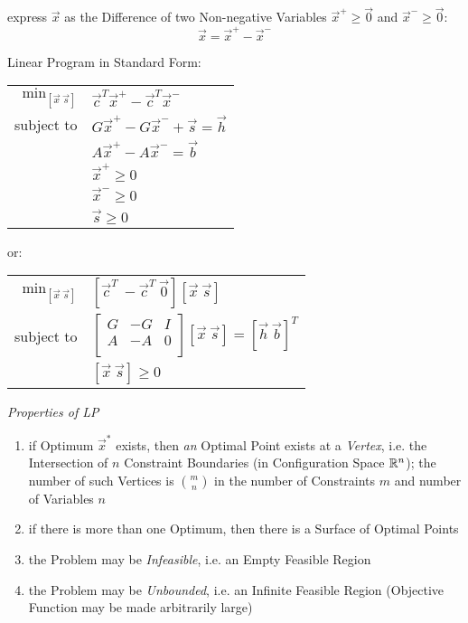 express $\vec{x}$ as the Difference of two Non-negative Variables $\vec{x}^+
\geq \vec{0}$ and $\vec{x}^- \geq \vec{0}$:
\[
  \vec{x} = \vec{x}^+ - \vec{x}^-
\]

Linear Program in Standard Form:

\begin{tabular}{r l}
  $\mathrm{min}_{[\vec{x} \ \vec{s}]}$ &
    $\vec{c}^T\vec{x}^+ - \vec{c}^T\vec{x}^-$     \\
  subject to               & $G\vec{x}^+ - G\vec{x}^- + \vec{s} = \vec{h}$   \\
                           & $A\vec{x}^+ - A\vec{x}^- = \vec{b}$ \\
                           & $\vec{x}^+ \geq 0$ \\
                           & $\vec{x}^- \geq 0$ \\
                           & $\vec{s}   \geq 0$ \\
\end{tabular}

or:

\begin{tabular}{r l}
  $\mathrm{min}_{[\vec{x} \ \vec{s}]}$ &
    $[\vec{c}^T \ -\vec{c}^T \ \vec{0}] [\vec{x} \ \vec{s}]$ \\
  subject to               &
    $\begin{bmatrix} G & -G & I \\ A & -A & 0 \\ \end{bmatrix}
      [\vec{x} \ \vec{s}] = [\vec{h} \ \vec{b}]^T$   \\
                           & $[\vec{x} \ \vec{s}] \geq 0$ \\
\end{tabular}


\emph{Properties of LP}

\begin{enumerate}
  \item if Optimum $\vec{x}^*$ exists, then \emph{an} Optimal Point exists at a
    \emph{Vertex}, i.e. the Intersection of $n$ Constraint Boundaries (in
    Configuration Space $\mathbb{R}^n$); the number of such Vertices is
    $\binom{m}{n}$ in the number of Constraints $m$ and number of Variables $n$
  \item if there is more than one Optimum, then there is a Surface of Optimal
    Points
  \item the Problem may be \emph{Infeasible}, i.e. an Empty Feasible Region
  \item the Problem may be \emph{Unbounded}, i.e. an Infinite Feasible Region
    (Objective Function may be made arbitrarily large)
\end{enumerate}

